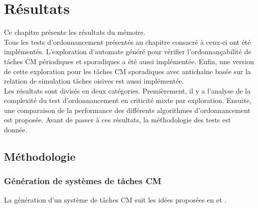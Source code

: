 \documentclass[12pt,a4paper,oneside]{book}
\theoremstyle{break}
\theoremstyle{breakplain}
\begin{document}
\chapter{Résultats}
\label{chap:res}
Ce chapitre présente les résultats du mémoire.\\

Tous les tests d'ordonnancement présentés au chapitre consacré à ceux-ci ont été implémentés. L'exploration d'automate généré pour vérifier l'ordonnançabilité de tâches CM périodiques et sporadiques a été aussi implémentée. Enfin, une version de cette exploration pour les tâches CM sporadiques avec antichaîne basée sur la relation de simulation tâches oisives est aussi implémentée.\\

Les résultats sont divisés en deux catégories. Premièrement, il y a l'analyse de la complexité du test d'ordonnancement en criticité mixte par exploration. Ensuite, une comparaison de la performance des différents algorithmes d'ordonnancement est proposée. Avant de passer à ces résultats, la méthodologie des tests est donnée.

\section{Méthodologie}
\subsection{Génération de systèmes de tâches CM}
La génération d'un système de tâches CM suit les idées proposées en \cite{ekberg2012outstanding} et \cite{geeraerts2013multiprocessor}.\\
\end{document}
